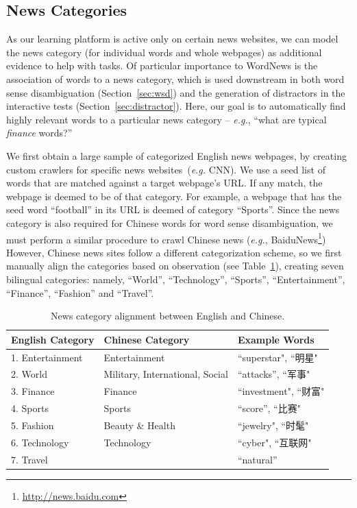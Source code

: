 \begin{CJK}{UTF8}{gbsn}
\subsection{News Categories}
\label{subsec:category}
As our learning platform is active only on certain news websites, we
can model the news category (for individual words and whole webpages)
as additional evidence to help with tasks.  Of particular importance
to WordNews is the association of words to a news category, which is
used downstream in both word sense disambiguation
(Section~\ref{sec:wsd}) and the generation of distractors in the
interactive tests (Section~\ref{sec:distractor}).  Here, our goal is
to automatically find highly relevant words to a particular news
category -- {\it e.g.}, ``what are typical {\it finance} words?''

We first obtain a large sample of categorized English news webpages,
by creating custom crawlers for specific news websites~({\it e.g.}
CNN).  We use a seed list of words that are matched against a target
webpage's URL.  If any match, the webpage is deemed to be of that
category.  For example, a webpage that has the seed word ``football''
in its URL is deemed of category ``Sports''.  Since the news category
is also required for Chinese words for word sense disambiguation, we
must perform a similar procedure to crawl Chinese news ({\it e.g.},
BaiduNews\footnote{\url{http://news.baidu.com}}) However, Chinese news
sites follow a different categorization scheme, so we first manually
align the categories based on observation (see Table~\ref{table:cat}),
creating seven bilingual categories: namely, ``World'',
``Technology'', ``Sports'', ``Entertainment'', ``Finance'',
``Fashion'' and ``Travel''.

\begin{table}[t]
\centering
  \caption{News category alignment between English and Chinese.}
  \label{table:cat}
  \begin{tabular}{| p{2.4cm} | p{2.2cm} | p{1.9cm} |}
    \hline
    {\bf English \qquad Category} & {\bf Chinese \qquad Category} & {\bf Example Words}\\
    \hline
    1. Entertainment & Entertainment & ``superstar", ``明星"\\
    \hline
    2. World &  Military, \qquad International, Social & ``attacks'', ``军事"  \\
    \hline
    3. Finance & Finance & ``investment", ``财富"\\
    \hline
    4. Sports & Sports & ``score'', ``比赛" \\
    \hline
    5. Fashion &  Beauty \& Health & ``jewelry", ``时髦"\\
    \hline
    6. Technology & Technology  & ``cyber", ``互联网"\\ \hline
    7. Travel  &  & ``natural'' \\
    \hline
  \end{tabular}
\end{table}


\end{CJK}

